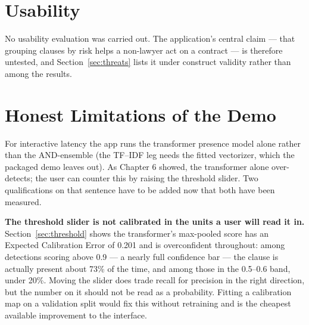 \section{Usability}
\label{sec:usability}
No usability evaluation was carried out. The application's central claim --- that grouping clauses by risk helps a non-lawyer act on a contract --- is therefore untested, and Section~\ref{sec:threats} lists it under construct validity rather than among the results.

\section{Honest Limitations of the Demo}
\label{sec:demolimits}
For interactive latency the app runs the transformer presence model alone rather than the AND-ensemble (the TF--IDF leg needs the fitted vectorizer, which the packaged demo leaves out). As Chapter 6 showed, the transformer alone over-detects; the user can counter this by raising the threshold slider. Two qualifications on that sentence have to be added now that both have been measured.

\textbf{The threshold slider is not calibrated in the units a user will read it in.} Section~\ref{sec:threshold} shows the transformer's max-pooled score has an Expected Calibration Error of 0.201 and is overconfident throughout: among detections scoring above 0.9 --- a nearly full confidence bar --- the clause is actually present about 73\% of the time, and among those in the 0.5--0.6 band, under 20\%. Moving the slider does trade recall for precision in the right direction, but the number on it should not be read as a probability. Fitting a calibration map on a validation split would fix this without retraining and is the cheapest available improvement to the interface.

